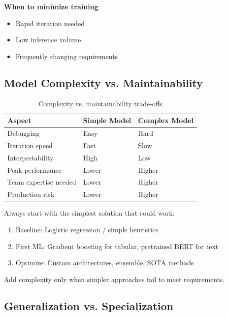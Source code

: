 \textbf{When to minimize training}:
\begin{itemize}
    \item Rapid iteration needed
    \item Low inference volume
    \item Frequently changing requirements
\end{itemize}

\subsection{Model Complexity vs. Maintainability}

\begin{table}[H]
\centering
\caption{Complexity vs. maintainability trade-offs}
\begin{tabularx}{\textwidth}{lXX}
\toprule
\textbf{Aspect} & \textbf{Simple Model} & \textbf{Complex Model} \\
\midrule
Debugging & Easy & Hard \\
Iteration speed & Fast & Slow \\
Interpretability & High & Low \\
Peak performance & Lower & Higher \\
Team expertise needed & Lower & Higher \\
Production risk & Lower & Higher \\
\bottomrule
\end{tabularx}
\end{table}

\begin{keyinsight}
Always start with the simplest solution that could work:
\begin{enumerate}
    \item Baseline: Logistic regression / simple heuristics
    \item First ML: Gradient boosting for tabular, pretrained BERT for text
    \item Optimize: Custom architectures, ensemble, SOTA methods
\end{enumerate}
Add complexity only when simpler approaches fail to meet requirements.
\end{keyinsight}

\subsection{Generalization vs. Specialization}

